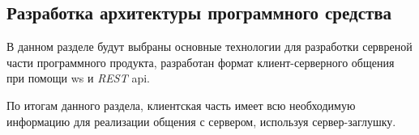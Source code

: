 \subsection{Разработка архитектуры программного средства}
\label{sec:development:arch:pp}

В данном разделе будут выбраны основные технологии для разработки сервреной части программного продукта, разработан формат клиент-серверного общения при помощи \gls{ws} и \textit{REST} \gls{api}.



% 


По итогам данного раздела, клиентская часть имеет всю необходимую информацию для реализации общения с сервером, используя сервер-заглушку.